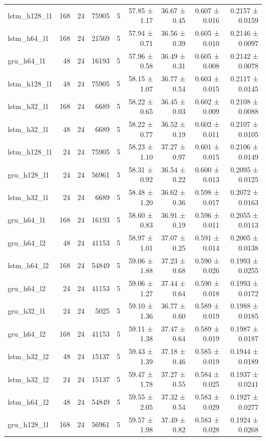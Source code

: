 \begin{table}[htbp]
\begin{tabular}{lrrrrrrrr}
lstm\_h128\_l1 & 168 & 24 & 75905 & 5 & 57.85 ± 1.17 & 36.67 ± 0.45 & 0.607 ± 0.016 & 0.2157 ± 0.0159 \\
lstm\_h64\_l1 & 168 & 24 & 21569 & 5 & 57.94 ± 0.71 & 36.56 ± 0.39 & 0.605 ± 0.010 & 0.2146 ± 0.0097 \\
gru\_h64\_l1 & 48 & 24 & 16193 & 5 & 57.96 ± 0.58 & 36.49 ± 0.31 & 0.605 ± 0.008 & 0.2142 ± 0.0078 \\
lstm\_h128\_l1 & 48 & 24 & 75905 & 5 & 58.15 ± 1.07 & 36.77 ± 0.54 & 0.603 ± 0.015 & 0.2117 ± 0.0145 \\
lstm\_h32\_l1 & 168 & 24 & 6689 & 5 & 58.22 ± 0.65 & 36.45 ± 0.03 & 0.602 ± 0.009 & 0.2108 ± 0.0088 \\
lstm\_h32\_l1 & 48 & 24 & 6689 & 5 & 58.22 ± 0.77 & 36.52 ± 0.19 & 0.602 ± 0.011 & 0.2107 ± 0.0105 \\
lstm\_h128\_l1 & 24 & 24 & 75905 & 5 & 58.23 ± 1.10 & 37.27 ± 0.97 & 0.601 ± 0.015 & 0.2106 ± 0.0149 \\
gru\_h128\_l1 & 24 & 24 & 56961 & 5 & 58.31 ± 0.92 & 36.54 ± 0.22 & 0.600 ± 0.013 & 0.2095 ± 0.0125 \\
lstm\_h32\_l1 & 24 & 24 & 6689 & 5 & 58.48 ± 1.20 & 36.62 ± 0.36 & 0.598 ± 0.017 & 0.2072 ± 0.0163 \\
gru\_h64\_l1 & 168 & 24 & 16193 & 5 & 58.60 ± 0.83 & 36.91 ± 0.19 & 0.596 ± 0.011 & 0.2055 ± 0.0113 \\
gru\_h64\_l2 & 48 & 24 & 41153 & 5 & 58.97 ± 1.01 & 37.07 ± 0.25 & 0.591 ± 0.014 & 0.2005 ± 0.0138 \\
lstm\_h64\_l2 & 168 & 24 & 54849 & 5 & 59.06 ± 1.88 & 37.23 ± 0.68 & 0.590 ± 0.026 & 0.1993 ± 0.0255 \\
gru\_h64\_l2 & 24 & 24 & 41153 & 5 & 59.06 ± 1.27 & 37.44 ± 0.64 & 0.590 ± 0.018 & 0.1993 ± 0.0172 \\
gru\_h32\_l1 & 24 & 24 & 5025 & 5 & 59.10 ± 1.36 & 36.77 ± 0.60 & 0.589 ± 0.019 & 0.1988 ± 0.0185 \\
gru\_h64\_l2 & 168 & 24 & 41153 & 5 & 59.11 ± 1.38 & 37.47 ± 0.64 & 0.589 ± 0.019 & 0.1987 ± 0.0187 \\
lstm\_h32\_l2 & 48 & 24 & 15137 & 5 & 59.43 ± 1.39 & 37.18 ± 0.46 & 0.585 ± 0.019 & 0.1944 ± 0.0189 \\
lstm\_h32\_l2 & 24 & 24 & 15137 & 5 & 59.47 ± 1.78 & 37.27 ± 0.55 & 0.584 ± 0.025 & 0.1937 ± 0.0241 \\
lstm\_h64\_l2 & 48 & 24 & 54849 & 5 & 59.55 ± 2.05 & 37.32 ± 0.54 & 0.583 ± 0.029 & 0.1927 ± 0.0277 \\
gru\_h128\_l1 & 168 & 24 & 56961 & 5 & 59.57 ± 1.98 & 37.49 ± 0.82 & 0.583 ± 0.028 & 0.1924 ± 0.0268 \\

\end{tabular}
\end{table}

